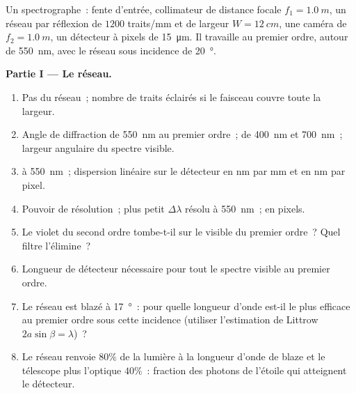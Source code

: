 \begin{problem}
\label{pb:b2:gratings:1}

Un spectrographe~: fente d'entrée, collimateur de distance focale $f_1 =
\qty{1.0}{m}$, un réseau par réflexion de $1200$ traits/mm et de largeur $W =
\qty{12}{cm}$, une caméra de $f_2 = \qty{1.0}{m}$, un détecteur à pixels de \qty{15}{\micro m}.
Il travaille au premier ordre, autour de \qty{550}{nm}, avec le
réseau sous incidence de \qty{20}{\degree}.

\medskip
\noindent\textbf{Partie I --- Le réseau.}
\begin{enumerate}
  \item Pas du réseau~; nombre de traits éclairés si le faisceau couvre
        toute la largeur.
  \item Angle de diffraction de \qty{550}{nm} au premier ordre~; de
        \qty{400}{nm} et \qty{700}{nm}~; largeur angulaire du spectre
        visible.
  \item {} à \qty{550}{nm}~; dispersion linéaire sur le
        détecteur en nm par mm et en nm par pixel.
  \item Pouvoir de résolution~; plus petit $\Delta\lambda$ résolu à \qty{550}{nm}~; en
        pixels.
  \item Le violet du second ordre tombe-t-il sur le visible du premier
        ordre~? Quel filtre l'élimine~?
  \item Longueur de détecteur nécessaire pour tout le spectre visible au
        premier ordre.
  \item Le réseau est blazé à \qty{17}{\degree}~: pour quelle longueur d'onde
        est-il le plus efficace au premier ordre sous cette incidence (utiliser
        l'estimation de Littrow $2a\sin\beta = \lambda$)~?
  \item Le réseau renvoie $80\%$ de la lumière à la longueur d'onde de blaze
        et le télescope plus l'optique $40\%$~: fraction des photons de l'étoile
        qui atteignent le détecteur.
\end{enumerate}


\end{problem}
